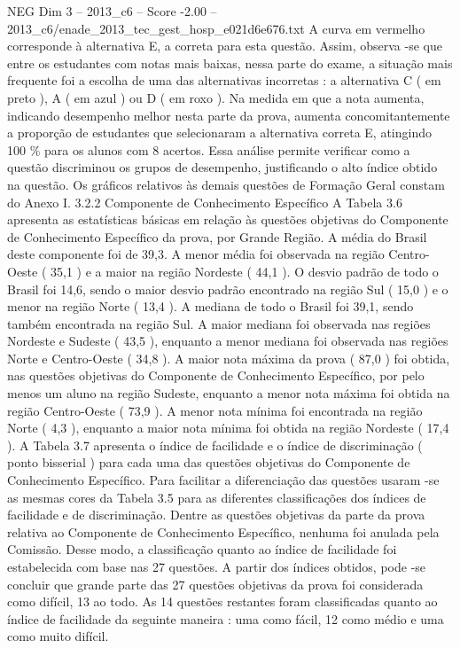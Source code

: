 \begin{textsample}{NEG Dim 3 – 2013\_c6 – Score -2.00 – 2013\_c6/enade\_2013\_tec\_gest\_hosp\_e021d6e676.txt}
A curva em vermelho corresponde à alternativa E, a correta para esta questão.
Assim, observa -se que entre os estudantes com notas mais baixas, nessa parte do exame, a situação mais frequente foi a escolha de uma das alternativas incorretas : a alternativa C ( em preto ), A ( em azul ) ou D ( em roxo ).
Na medida em que a nota aumenta, indicando desempenho melhor nesta parte da prova, aumenta concomitantemente a proporção de estudantes que selecionaram a alternativa correta E, atingindo 100 \% para os alunos com 8 acertos.
Essa análise permite verificar como a questão discriminou os grupos de desempenho, justificando o alto índice obtido na questão.
Os gráficos relativos às demais questões de Formação Geral constam do Anexo I. 3.2.2 Componente de Conhecimento Específico A Tabela 3.6 apresenta as estatísticas básicas em relação às questões objetivas do Componente de Conhecimento Específico da prova, por Grande Região.
A média do Brasil deste componente foi de 39,3.
A menor média foi observada na região Centro-Oeste ( 35,1 ) e a maior na região Nordeste ( 44,1 ).
O desvio padrão de todo o Brasil foi 14,6, sendo o maior desvio padrão encontrado na região Sul ( 15,0 ) e o menor na região Norte ( 13,4 ).
A mediana de todo o Brasil foi 39,1, sendo também encontrada na região Sul.
A maior mediana foi observada nas regiões Nordeste e Sudeste ( 43,5 ), enquanto a menor mediana foi observada nas regiões Norte e Centro-Oeste ( 34,8 ).
A maior nota máxima da prova ( 87,0 ) foi obtida, nas questões objetivas do Componente de Conhecimento Específico, por pelo menos um aluno na região Sudeste, enquanto a menor nota máxima foi obtida na região Centro-Oeste ( 73,9 ).
A menor nota mínima foi encontrada na região Norte ( 4,3 ), enquanto a maior nota mínima foi obtida na região Nordeste ( 17,4 ).
A Tabela 3.7 apresenta o índice de facilidade e o índice de discriminação ( ponto bisserial ) para cada uma das questões objetivas do Componente de Conhecimento Específico.
Para facilitar a diferenciação das questões usaram -se as mesmas cores da Tabela 3.5 para as diferentes classificações dos índices de facilidade e de discriminação.
Dentre as questões objetivas da parte da prova relativa ao Componente de Conhecimento Específico, nenhuma foi anulada pela Comissão.
Desse modo, a classificação quanto ao índice de facilidade foi estabelecida com base nas 27 questões.
A partir dos índices obtidos, pode -se concluir que grande parte das 27 questões objetivas da prova foi considerada como difícil, 13 ao todo.
As 14 questões restantes foram classificadas quanto ao índice de facilidade da seguinte maneira : uma como fácil, 12 como médio e uma como muito difícil.

\end{textsample}
